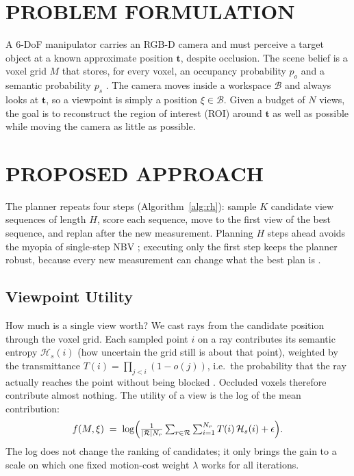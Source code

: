 
\section{PROBLEM FORMULATION}
\label{sec:problem}

A 6-DoF manipulator carries an RGB-D camera and must perceive a target
object at a known approximate position $\mathbf{t}$, despite occlusion.
The scene belief is a voxel grid $M$ that stores, for every voxel, an
occupancy probability $p_o$ and a semantic probability $p_s$
\cite{burusa2024}. The camera moves inside a workspace $\mathcal{B}$ and
always looks at $\mathbf{t}$, so a viewpoint is simply a position
$\xi \in \mathcal{B}$. Given a budget of $N$ views, the goal is to
reconstruct the region of interest (ROI) around $\mathbf{t}$ as well as
possible while moving the camera as little as possible.

\section{PROPOSED APPROACH}
\label{sec:method}

The planner repeats four steps (Algorithm~\ref{alg:rh}): sample $K$
candidate view sequences of length $H$, score each sequence, move to the
first view of the best sequence, and replan after the new measurement.
Planning $H$ steps ahead avoids the myopia of single-step NBV
\cite{burusa2024}; executing only the first step keeps the planner
robust, because every new measurement can change what the best plan is
\cite{bircher2016}.

\subsection{Viewpoint Utility}
\label{sec:method-utility}

How much is a single view worth? We cast rays from the candidate
position through the voxel grid. Each sampled point $i$ on a ray
contributes its semantic entropy $\mathcal{H}_s(i)$ (how uncertain the
grid still is about that point), weighted by the transmittance
$T(i) = \prod_{j<i}(1 - o(j))$, i.e.\ the probability that the ray
actually reaches the point without being blocked
\cite{delmerico2018}. Occluded voxels therefore contribute almost
nothing. The utility of a view is the log of the mean contribution:
%
\begin{equation}
  f(M, \xi) \;=\; \log \Bigl(
  \tfrac{1}{|\mathcal{R}| N_r}
  \textstyle\sum_{r \in \mathcal{R}} \sum_{i=1}^{N_r}
  T(i)\, \mathcal{H}_s(i) + \epsilon \Bigr).
  \label{eq:utility}
\end{equation}
%
The log does not change the ranking of candidates; it only brings the
gain to a scale on which one fixed motion-cost weight $\lambda$ works
for all iterations.

